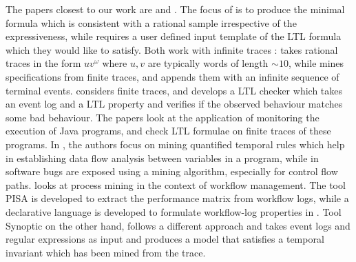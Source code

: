  The papers closest to our work are  
\cite{lemieux2015generalTexada} and \cite{ltlFMCAD18}.  The focus of
\cite{ltlFMCAD18} is to produce the minimal formula which is consistent with a
rational sample irrespective of the expressiveness, while
\cite{lemieux2015generalTexada} requires a user defined input template of the
LTL formula which they would like to satisfy.  Both work with infinite traces :
\cite{ltlFMCAD18} takes rational traces in the form $uv^{\omega}$ where $u,v$
are typically words of length $\sim 10$, while \cite{lemieux2015generalTexada}
mines specifications from finite traces, and appends them with an infinite
sequence of terminal events.  
 \cite{DBLP:conf/otm/AalstBD05t42} considers finite traces, and develops a LTL
checker which takes an event log and a LTL property and verifies if the observed
behaviour matches some bad behaviour. The papers
\cite{989799t19,10.1007/3-540-46002-0_24t20} look at the application of
monitoring the execution of Java programs, and check LTL formulae on finite
traces of these programs.   
In \cite{lo2012mining33}, the authors focus on mining quantified temporal rules
which help in establishing data flow analysis between variables in a program,
while in \cite{weimer2005mining46} software bugs are exposed  using a mining
algorithm, especially for control flow paths. \cite{agrawal1998miningt9} looks
at process mining in the context of workflow management. The tool PISA
\cite{zur2000workflowt27} is developed to extract the performance matrix from
workflow logs, while a declarative language  is developed to formulate
workflow-log properties in \cite{6951474t5}. Tool Synoptic
\cite{beschastnikh2011leveraging7} on the other hand, follows  a different
approach and takes event logs and regular expressions as input and produces a
model that satisfies a temporal invariant which has been mined from the trace.
